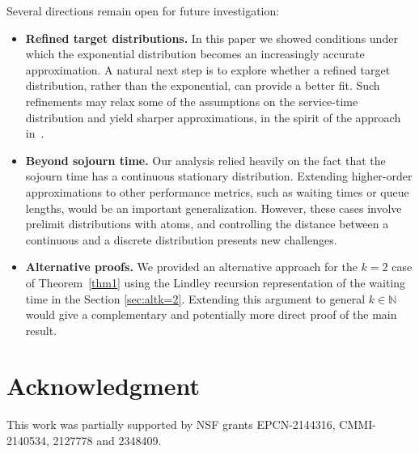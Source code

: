 \documentclass[11pt,letterpaper,reqno]{article}
\theoremstyle{thmstyleone}%
\theoremstyle{thmstyletwo}%
\theoremstyle{thmstylethree}%
\numberwithin{equation}{section}
\begin{document}
Several directions remain open for future investigation:
\begin{itemize}
   \item \textbf{Refined target distributions.} In this paper we showed conditions under which the exponential distribution becomes an increasingly accurate approximation. A natural next step is to explore whether a refined target distribution, rather than the exponential, can provide a better fit. Such refinements may relax some of the assumptions on the service-time distribution and yield sharper approximations, in the spirit of the approach in~\cite{BAD}.
   \item \textbf{Beyond sojourn time.} Our analysis relied heavily on the fact that the sojourn time has a continuous stationary distribution. Extending higher-order approximations to other performance metrics, such as waiting times or queue lengths, would be an important generalization. However, these cases involve prelimit distributions with atoms, and controlling the distance between a continuous and a discrete distribution presents new challenges.  
   \item \textbf{Alternative proofs.} We provided an alternative approach for the $k=2$  case of Theorem~\ref{thm1} using the Lindley recursion representation of the waiting time in the Section \ref{sec:altk=2}. Extending this argument to general $k \in \mathbb{N}$ would give a complementary and potentially more direct proof of the main result.
\end{itemize}  
\section{Acknowledgment}
This work was partially supported by NSF grants EPCN-2144316, CMMI-2140534, 2127778 and 2348409.






\appendix
\end{document}
